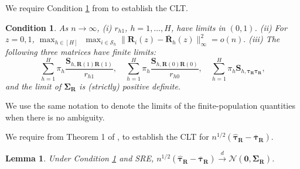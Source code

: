 \documentclass[12pt]{article}
\newtheorem{lemma}{Lemma}
\newtheorem{condition}{Condition}
\newcommand{\wconv}{\stackrel{d}{\rightarrow}}
\newcommand{\ms}{\mathcal{S}}
\newcommand{\bs}{\boldsymbol}
\begin{document}
We require Condition \ref{a:assumption-for-CLT-sre} from \cite{wang2021rerandomization} to establish the CLT. 
\begin{condition}
\label{a:assumption-for-CLT-sre}
As $n \to \infty$, (i) $r_{h1}$, $h=1,\ldots,H$, have limits in $(0,1)$.
(ii) For $z=0,1$, $\max_{h\in [H]}$ $\max_{i\in \ms_h}\|\bs{R}_{i}(z)- \bar{\bs{R}}_{h}(z)\|_\infty^2 = o(n).$ (iii) The following three matrices have finite limits:
$$\sum_{h=1}^H \pi_{h}\frac{\bs{S}_{h, \bs{R}(1)\bs{R}(1)}}{r_{h1}},\quad \sum_{h=1}^H \pi_{h}\frac{\bs{S}_{h, \bs{R}(0)\bs{R}(0)}}{r_{h0}},\quad \sum_{h=1}^H \pi_{h}\bs{S}_{h, \bs{\tau_R} \bs{\tau_R}},$$
and the limit of $\bs{\Sigma}_{\bs{R}}$ is (strictly) positive definite.
\end{condition}
We use the same notation to denote the limits of the finite-population quantities when there is no ambiguity.


We require  from Theorem 1 of \cite{wang2021rerandomization}, to establish the CLT for $n^{1/2}(\hat{\bs{\tau}}_{\bs{R}}-\bar{\bs{\tau}}_{\bs{R}})$.
\begin{lemma}
\label{lem:CLT-for-sre}
    Under Condition \ref{a:assumption-for-CLT-sre} and SRE, $n^{1/2}(\hat{\bs{\tau}}_{\bs{R}}-\bar{\bs{\tau}}_{\bs{R}})\wconv\mathcal{N}(\bs{0},\bs{\Sigma}_{\bs{R}})$.
\end{lemma}
\end{document}
